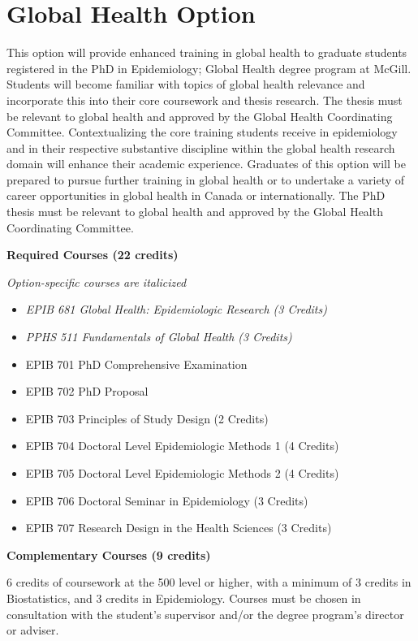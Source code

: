 \documentclass[
  letterpaper,
  DIV=11,
  numbers=noendperiod]{scrreprt}
\providecommand{\tightlist}{%
  \setlength{\itemsep}{0pt}\setlength{\parskip}{0pt}}
\begin{document}
\section{Global Health Option}\label{global-health-option}

This option will provide enhanced training in global health to graduate
students registered in the PhD in Epidemiology; Global Health degree
program at McGill. Students will become familiar with topics of global
health relevance and incorporate this into their core coursework and
thesis research. The thesis must be relevant to global health and
approved by the Global Health Coordinating Committee. Contextualizing
the core training students receive in epidemiology and in their
respective substantive discipline within the global health research
domain will enhance their academic experience. Graduates of this option
will be prepared to pursue further training in global health or to
undertake a variety of career opportunities in global health in Canada
or internationally. The PhD thesis must be relevant to global health and
approved by the Global Health Coordinating Committee.

\textbf{Required Courses (22 credits)}

\emph{Option-specific courses are italicized}

\begin{itemize}
\tightlist
\item
  \emph{EPIB 681 Global Health: Epidemiologic Research (3 Credits)}
\item
  \emph{PPHS 511 Fundamentals of Global Health (3 Credits)}
\item
  EPIB 701 PhD Comprehensive Examination
\item
  EPIB 702 PhD Proposal
\item
  EPIB 703 Principles of Study Design (2 Credits)
\item
  EPIB 704 Doctoral Level Epidemiologic Methods 1 (4 Credits)
\item
  EPIB 705 Doctoral Level Epidemiologic Methods 2 (4 Credits)
\item
  EPIB 706 Doctoral Seminar in Epidemiology (3 Credits)
\item
  EPIB 707 Research Design in the Health Sciences (3 Credits)
\end{itemize}

\textbf{Complementary Courses (9 credits)}

6 credits of coursework at the 500 level or higher, with a minimum of 3
credits in Biostatistics, and 3 credits in Epidemiology. Courses must be
chosen in consultation with the student's supervisor and/or the degree
program's director or adviser.
\end{document}
